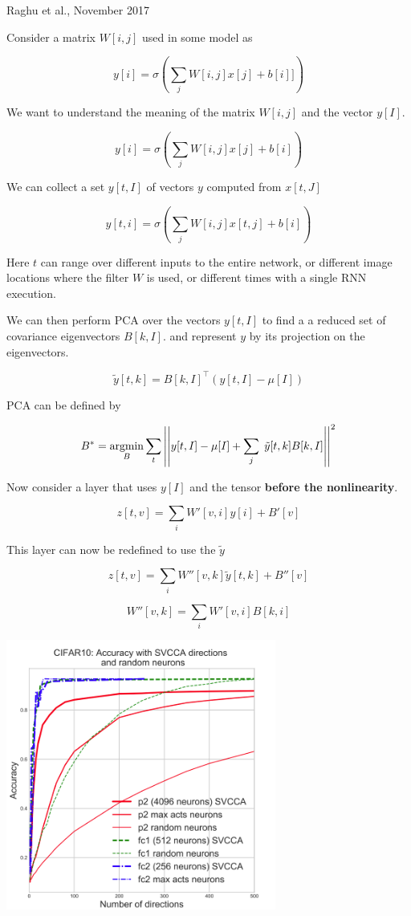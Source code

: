 {
{Raghu et al., November 2017}

Consider a matrix $W[i,j]$ used in some model as

\vfill
$$y[i] = \sigma\left(\sum_j W[i,j] x[j] + b[i]]\right)$$

\vfill
We want to understand the meaning of the matrix $W[i,j]$ and the vector $y[I]$.


$$y[i] = \sigma\left(\sum_j W[i,j] x[j] + b[i]\right)$$

\vfill
We can collect a set $y[t,I]$  of vectors $y$ computed from $x[t,J]$

\vfill
$$y[t,i] = \sigma\left(\sum_j W[i,j] x[t,j] + b[i]\right)$$

Here $t$ can range over different inputs to the entire network, or different image locations where the filter $W$ is used,
or different times with a single RNN execution.


\vfill
We can then perform PCA over the vectors $y[t,I]$ to find a a reduced set of covariance eigenvectors $B[k,I]$.
and represent $y$ by its projection on the eigenvectors.

$$\tilde{y}[t,k] = B[k,I]^\top (y[t,I] - \mu[I])$$

\vfill
PCA can be defined by

\vfill
$$B^* = \operatorname*{argmin}_B \sum_t \left|\left|y[t,I] - \mu[I] + \sum_j \;\tilde{y}[t,k]B[k,I]\right|\right|^2$$


Now consider a layer that uses $y[I]$ and the tensor {\bf before the nonlinearity}.

\vfill
$$z[t,v] = \sum_i W'[v,i]y[i] + B'[v]$$

\vfill
This layer can now be redefined to use the $\tilde{y}$

\vfill
$$z[t,v] = \sum_i W''[v,k]\tilde{y}[t,k] + B''[v]$$

\vfill
$$W''[v,k] = \sum_i W'[v,i]B[k,i]$$


\centerline{\includegraphics[height=3.5in]{../images/SVCCA}}

}
